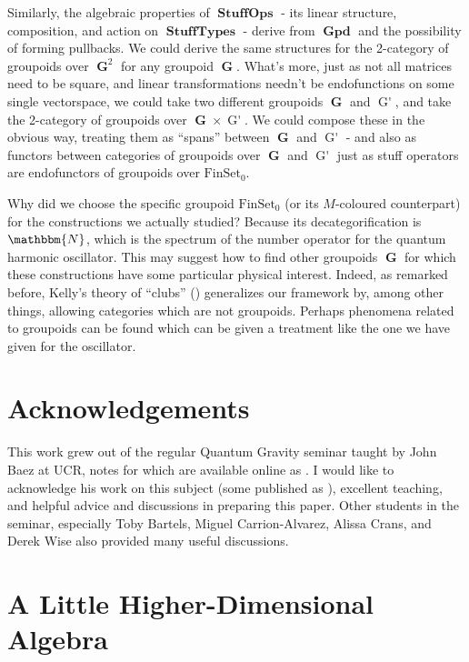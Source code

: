 \documentclass{amsart} \usepackage{amsmath,amssymb,bbm}
\newcommand{\opname}[1]{\operatorname{#1}}
\newcommand{\catname}[1]{\boldsymbol{\opname{{#1}}}}
\newcommand{\FSN}{\catname{FinSet_0}}
\begin{document}
Similarly, the algebraic properties of $\catname{StuffOps}$ - its
linear structure, composition, and action on $\catname{StuffTypes}$ -
derive from $\catname{Gpd}$ and the possibility of forming pullbacks.
We could derive the same structures for the 2-category of groupoids
over $\catname{G}^2$ for any groupoid $\catname{G}$.  What's more,
just as not all matrices need to be square, and linear transformations
needn't be endofunctions on some single vectorspace, we could take two
different groupoids $\catname{G}$ and $\catname{G'}$, and take the
2-category of groupoids over $\catname{G} \times \catname{G'}$.  We
could compose these in the obvious way, treating them as ``spans''
between $\catname{G}$ and $\catname{G'}$ - and also as functors
between categories of groupoids over $\catname{G}$ and $\catname{G'}$
just as stuff operators are endofunctors of groupoids over $\FSN$.

Why did we choose the specific groupoid $\FSN$ (or its $M$-coloured
counterpart) for the constructions we actually studied?  Because its
decategorification is $\mathbbm{N}$, which is the spectrum of the
number operator for the quantum harmonic oscillator.  This may suggest
how to find other groupoids $\catname{G}$ for which these
constructions have some particular physical interest.  Indeed, as
remarked before, Kelly's theory of ``clubs'' ({\cite{kelly}})
generalizes our framework by, among other things, allowing categories
which are not groupoids.  Perhaps phenomena related to groupoids can
be found which can be given a treatment like the one we have given for
the oscillator.

\section{Acknowledgements}

This work grew out of the regular Quantum Gravity seminar taught by
John Baez at UCR, notes for which are available online as
\cite{catquan}.  I would like to acknowledge his work on this subject
(some published as \cite{finfeyn}), excellent teaching, and helpful
advice and discussions in preparing this paper.  Other students in the
seminar, especially Toby Bartels, Miguel Carrion-Alvarez, Alissa
Crans, and Derek Wise also provided many useful discussions.

{\pagebreak}
\appendix\section{A Little Higher-Dimensional Algebra}\label{sec:catalgebra}
\end{document}
